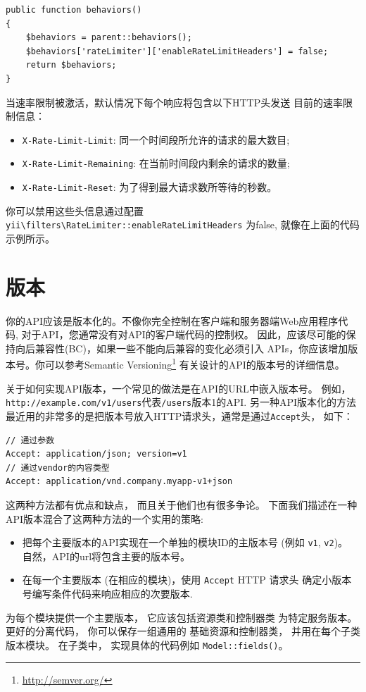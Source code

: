 \lstset{language=php}\begin{lstlisting}
public function behaviors()
{
    $behaviors = parent::behaviors();
    $behaviors['rateLimiter']['enableRateLimitHeaders'] = false;
    return $behaviors;
}
\end{lstlisting}
当速率限制被激活，默认情况下每个响应将包含以下HTTP头发送
目前的速率限制信息：

\begin{itemize}
\item \lstinline|X-Rate-Limit-Limit|: 同一个时间段所允许的请求的最大数目;
\item \lstinline|X-Rate-Limit-Remaining|: 在当前时间段内剩余的请求的数量;
\item \lstinline|X-Rate-Limit-Reset|: 为了得到最大请求数所等待的秒数。
\end{itemize}
你可以禁用这些头信息通过配置 \texttt{yii{\allowbreak{}\textbackslash}filters{\allowbreak{}\textbackslash}RateLimiter\allowbreak{}::\allowbreak{}enableRateLimitHeaders} 为false,
就像在上面的代码示例所示。



\label{rest-versioning.md}\section{版本}
你的API应该是版本化的。不像你完全控制在客户端和服务器端Web应用程序代码, 对于API，您通常没有对API的客户端代码的控制权。
因此，应该尽可能的保持向后兼容性(BC)，如果一些不能向后兼容的变化必须引入
APIs，你应该增加版本号。你可以参考Semantic Versioning\footnote{\url{http://semver.org/}}
有关设计的API的版本号的详细信息。

关于如何实现API版本，一个常见的做法是在API的URL中嵌入版本号。
例如，\lstinline|http://example.com/v1/users|代表\lstinline|/users|版本1的API. 另一种API版本化的方法最近用的非常多的是把版本号放入HTTP请求头，通常是通过\lstinline|Accept|头，
如下：

\begin{lstlisting}
// 通过参数
Accept: application/json; version=v1
// 通过vendor的内容类型
Accept: application/vnd.company.myapp-v1+json
\end{lstlisting}
这两种方法都有优点和缺点， 而且关于他们也有很多争论。
下面我们描述在一种API版本混合了这两种方法的一个实用的策略:

\begin{itemize}
\item 把每个主要版本的API实现在一个单独的模块ID的主版本号 (例如 \lstinline|v1|, \lstinline|v2|)。
自然，API的url将包含主要的版本号。
\item 在每一个主要版本 (在相应的模块)，使用 \lstinline|Accept| HTTP 请求头
确定小版本号编写条件代码来响应相应的次要版本.
\end{itemize}
为每个模块提供一个主要版本， 它应该包括资源类和控制器类
为特定服务版本。 更好的分离代码， 你可以保存一组通用的
基础资源和控制器类， 并用在每个子类版本模块。 在子类中，
实现具体的代码例如 \lstinline|Model::fields()|。

